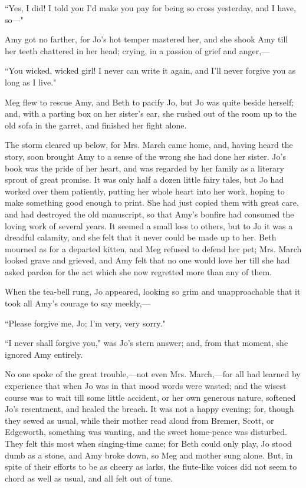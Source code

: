 ``Yes, I did! I told you I'd make you pay for being so
cross yesterday, and I have, so---"

Amy got no farther, for Jo's hot temper mastered her,
and she shook Amy till her teeth chattered in her head; crying, in a
passion of grief and anger,---

``You wicked, wicked girl! I never can write it again, and
I'll never forgive you as long as I live."

Meg flew to rescue Amy, and Beth to pacify Jo, but Jo was quite beside
herself; and, with a parting box on her sister's ear,
she rushed out of the room up to the old sofa in the garret, and
finished her fight alone.

The storm cleared up below, for Mrs. March came home, and, having heard
the story, soon brought Amy to a sense of the wrong she had done her
sister. Jo's book was the pride of her heart, and was
regarded by her family as a literary sprout of great promise. It was
only half a dozen little fairy tales, but Jo had worked over them
patiently, putting her whole heart into her work, hoping to make
something good enough to print. She had just copied them with great
care, and had destroyed the old manuscript, so that
Amy's bonfire had consumed the loving work of several
years. It seemed a small loss to others, but to Jo it was a dreadful
calamity, and she felt that it never could be made up to her. Beth
mourned as for a departed kitten, and Meg refused to defend her pet;
Mrs. March looked grave and grieved, and Amy felt that no one would love
her till she had asked pardon for the act which she now regretted more
than any of them.

When the tea-bell rung, Jo appeared, looking so grim and unapproachable
that it took all Amy's courage to say meekly,---

``Please forgive me, Jo; I'm very, very sorry."

``I never shall forgive you," was Jo's stern answer; and,
from that moment, she ignored Amy entirely.

No one spoke of the great trouble,---not even Mrs. March,---for all had
learned by experience that when Jo was in that mood words were wasted;
and the wisest course was to wait till some little accident, or her own
generous nature, softened Jo's resentment, and healed
the breach. It was not a happy evening; for, though they sewed as usual,
while their mother read aloud from Bremer, Scott, or Edgeworth,
something was wanting, and the sweet home-peace was disturbed. They felt
this most when singing-time came; for Beth could only play, Jo stood
dumb as a stone, and Amy broke down, so Meg and mother sung alone. But,
in spite of their efforts to be as cheery as larks, the flute-like
voices did not seem to chord as well as usual, and all felt out of tune.

